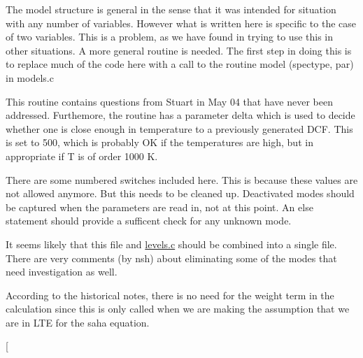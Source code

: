\begin{DoxyRefList}
\item[\label{bug__bug000008}%
\Hypertarget{bug__bug000008}%
Global \hyperlink{templates_8h_aca0d5b8835f560393ae64306e8f24ce3}{one\+\_\+continuum} (int spectype, double t, double g, double freqmin, double freqmax)]The model structure is general in the sense that it was intended for situation with any number of variables. However what is written here is specific to the case of two variables. This is a problem, as we have found in trying to use this in other situations. A more general routine is needed. The first step in doing this is to replace much of the code here with a call to the routine model (spectype, par) in models.\+c 
\item[\label{bug__bug000049}%
\Hypertarget{bug__bug000049}%
Global \hyperlink{templates_8h_a1e3f4af5624039f9a4937939331b5219}{one\+\_\+fb} (Wind\+Ptr one, double f1, double f2)]This routine contains questions from Stuart in May 04 that have never been addressed. Furthemore, the routine has a parameter delta which is used to decide whether one is close enough in temperature to a previously generated D\+CF. This is set to 500, which is probably OK if the temperatures are high, but in appropriate if T is of order 1000 K. 
\item[\label{bug__bug000033}%
\Hypertarget{bug__bug000033}%
Global \hyperlink{templates_8h_a0c0fa3305df1f5c000e0ed0a26d413d8}{one\+\_\+shot} (Plasma\+Ptr xplasma, int mode)]There are some numbered switches included here. This is because these values are not allowed anymore. But this needs to be cleaned up. Deactivated modes should be captured when the parameters are read in, not at this point. An else statement should provide a sufficent check for any unknown mode. 
\item[\label{bug__bug000038}%
\Hypertarget{bug__bug000038}%
File \hyperlink{partition_8c}{partition.c} ]It seems likely that this file and \hyperlink{levels_8c}{levels.\+c} should be combined into a single file. There are very comments (by nsh) about eliminating some of the modes that need investigation as well.  
\item[\label{bug__bug000039}%
\Hypertarget{bug__bug000039}%
Global \hyperlink{templates_8h_a2de3c1f3e0adc389cfda580a1003a688}{partition\+\_\+functions\+\_\+2} (Plasma\+Ptr xplasma, int xnion, double temp, double weight)]According to the historical notes, there is no need for the weight term in the calculation since this is only called when we are making the assumption that we are in L\+TE for the saha equation. 
\item[\label{bug__bug000040}%

\end{DoxyRefList}
